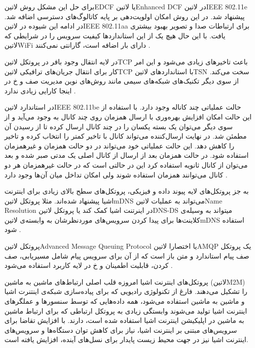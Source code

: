 برای حل این مشکل روش ‌لاتین{EDCF} یا ‌لاتین{Enhanced DCF} در ‌لاتین{IEEE 802.11e} پیشنهاد شد. در این روش امکان اولویت‌دهی بر پایه
کاتالوگ‌های دسترسی اضافه شد. در ادامه این شیوده در ‌لاتین{IEEE 802.11aa} برای ارتباطات صدا و تصویر بهبود بیشتری یافت.
با این حال هیچ یک از این استانداردها کیفیت سرویس را در شرایطی که ‌لاتین{WiFi} دارای بار اضافه است، گارانتی نمی‌کنند
.

در لایه انتقال وجود بافر در پروتکل ‌لاتین{TCP} باعث تاخیرهای زیادی می‌شود و این امر کار برای انتقال جریان‌های ترافیکی ‌لاتین{TCP}
با استانداردهای ‌لاتین{TSN} سخت می‌کند. از سوی دیگر تکنیک‌های شبکه‌های سیمی مانند روش‌های نوین مدیریت صف و ‌خ در اینجا
کارایی زیادی ندارد
.

در استاندارد ‌لاتین{IEEE 802.11be} حالت عملیاتی چند کاناله وجود دارد. با استفاده از این حالت امکان افزایش بهره‌وری با ارسال همزمان
روی چند کانال به وجود می‌آید و از سوی دیگر می‌توان یک بسته یکسان را در چند کانال ارسال کرده تا از رسیدن آن مطمئن شد. در نهایت ارسال‌کننده
می‌تواند کانال با تاخیر کمتر را انتخاب کرده و تاخیر را کاهش دهد. این حالت عملیاتی خود می‌تواند در دو حالت همزمان و غیرهمزمان استفاده شود.
در حالت همزمان بعد از ارسال از کانال اصلی یک مدتی صبر شده و بعد می‌توان از کانال ثانویه استفاده کرد این در حالتی است که در حالت غیرهمزمان
هر دو کانال می‌توانند همزمان استفاده شوند ولی امکان تداخل میان آن‌ها وجود دارد
.



به جز پروتکل‌های لایه پیوند داده و فیزیکی، پروتکل‌های سطح بالای زیادی برای اینترنت اشیا پیشنهاد شده‌اند.
مثلا پروتکل ‌لاتین{mDNS} می‌تواند به عملیات ‌لاتین{Name Resolution} در اینرتنت اشیا کمک کند یا پروتکل
‌لاتین{DNS-DS} میتواند به وسیله‌ی کلاینت‌ها برای پیدا کردن سرویس‌های موردنظرشان به وابسته‌ی ‌لاتین{mDNS} استفاده شود
.


پروتکل ‌لاتین{Advanced Message Queuing Protocol} یا اختصارا ‌لاتین{AMQP} یک پروتکل صف پیام استاندارد و متن باز است
که از آن برای سرویس پیام شامل مسیریابی، صف کردن، قابلیت اطمینان و ‌خ در لایه کاربرد استفاده می‌شود
.


پروتکل‌های اینترنت اشیا امروزه قلب اصلی ارتباط‌های ماشین به ماشین (‌لاتین{M2M}) را تشکیل می‌دهند. فارغ از تکنولوژی رادیویی که برای پیاده‌سازی شبکه‌ی اینتنرت اشیا و ماشین به ماشین استفاده می‌شود، همه داده‌هایی که توسط سنسورها و عملگرهای اینترنت اشیا
تولید می‌شوند وابستگی زیادی به پروتکل ارتباطی که برای ارتباط ماشین به ماشین در اپلیکیشن اینترنت اشیا استفاده شده است، دارند.
با افزایش تقاضا برای سرویس‌های مبتنی بر اینترنت اشیا، نیاز برای کاهش توان دستگاه‌ها و سرویس‌های اینترنت اشیا نیز در جهت محیط زیست پایدار برای نسل‌های آینده، افزایش یافته است.

